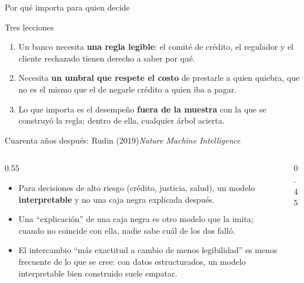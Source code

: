\documentclass{beamer}
\begin{document}
\begin{frame}{Por qué importa para quien decide}
\begin{block}{Tres lecciones}
\begin{enumerate}\itemsep4pt
  \item Un banco necesita \textbf{una regla legible}: el comité de crédito, el regulador y el cliente rechazado tienen derecho a saber por qué.
  \item Necesita \textbf{un umbral que respete el costo} de prestarle a quien quiebra, que no es el mismo que el de negarle crédito a quien iba a pagar.
  \item Lo que importa es el desempeño \textbf{fuera de la muestra} con la que se construyó la regla; dentro de ella, cualquier árbol acierta.
\end{enumerate}
\end{block}
\end{frame}

\begin{frame}{Cuarenta años después: Rudin (2019)}{\emph{Nature Machine Intelligence}}
\begin{columns}[T]
\begin{column}{0.55\textwidth}
\begin{itemize}\itemsep5pt
  \item Para decisiones de alto riesgo (crédito, justicia, salud), un modelo \textbf{interpretable} y no una caja negra explicada después.
  \item Una ``explicación'' de una caja negra es otro modelo que la imita; cuando no coincide con ella, nadie sabe cuál de los dos falló.
  \item El intercambio ``más exactitud a cambio de menos legibilidad'' es menos frecuente de lo que se cree: con datos estructurados, un modelo interpretable bien construido suele empatar.
\end{itemize}
\end{column}
\begin{column}{0.45\textwidth}
\end{column}
\end{columns}
\end{frame}
\end{document}
